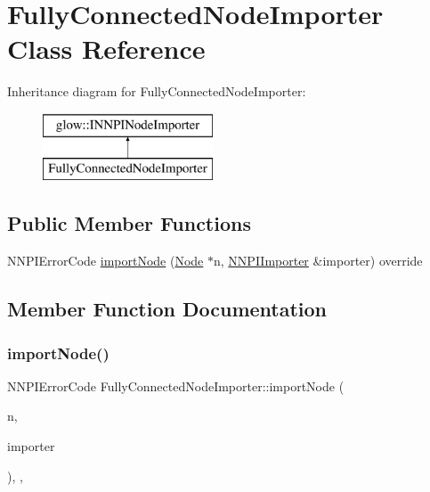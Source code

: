 \hypertarget{class_fully_connected_node_importer}{}\section{Fully\+Connected\+Node\+Importer Class Reference}
\label{class_fully_connected_node_importer}
Inheritance diagram for Fully\+Connected\+Node\+Importer\+:\begin{figure}[H]
\begin{center}
\leavevmode
\includegraphics[height=2.000000cm]{class_fully_connected_node_importer}
\end{center}
\end{figure}
\subsection*{Public Member Functions}
\begin{DoxyCompactItemize}
\item 
N\+N\+P\+I\+Error\+Code \hyperlink{class_fully_connected_node_importer_a567fe17c8fb522be6ce33f49d4c202be}{import\+Node} (\hyperlink{classglow_1_1_node}{Node} $\ast$n, \hyperlink{classglow_1_1_n_n_p_i_importer}{N\+N\+P\+I\+Importer} \&importer) override
\end{DoxyCompactItemize}


\subsection{Member Function Documentation}
\mbox{\label{class_fully_connected_node_importer_a567fe17c8fb522be6ce33f49d4c202be}} 
\subsubsection{\texorpdfstring{import\+Node()}{importNode()}}
{\footnotesize\ttfamily N\+N\+P\+I\+Error\+Code Fully\+Connected\+Node\+Importer\+::import\+Node (\begin{DoxyParamCaption}\item[{\hyperlink{classglow_1_1_node}{Node} $\ast$}]{n,  }\item[{\hyperlink{classglow_1_1_n_n_p_i_importer}{N\+N\+P\+I\+Importer} \&}]{importer }\end{DoxyParamCaption})\hspace{0.3cm}{\ttfamily [inline]}, {\ttfamily [override]}, {\ttfamily [virtual]}}

